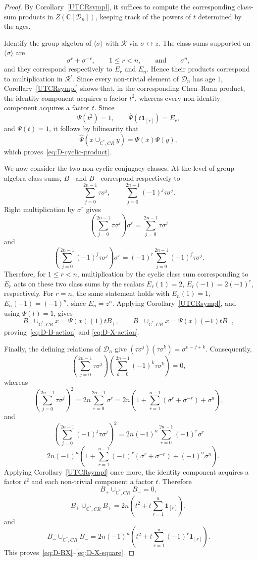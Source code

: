 \documentclass[a4paper,reqno]{amsart}
\theoremstyle{plain} %
\theoremstyle{definition} %
\theoremstyle{remark} %
\newcommand{\C}{\mathbb{C}}
\newcommand{\fo}{\mathbf{1}}
\newcommand{\cD}{{\mathcal D}}
\newcommand{\1}{\mathds{1}}   %
\begin{document}
\begin{proof}
By Corollary~\ref{UTCRsympl}, it suffices to compute the
corresponding class-sum products in $Z(\C[\cD_n])$, keeping track of
the powers of $t$ determined by the ages.

Identify the group algebra of $\langle\sigma\rangle$ with $\mathcal R$
via $\sigma\leftrightarrow z$. The class sums supported on
$\langle\sigma\rangle$ are
\[
 \sigma^r+\sigma^{-r},\qquad 1\leq r<n,
 \qquad\text{and}\qquad
 \sigma^n,
\]
and they correspond respectively to $E_r$ and $E_n$.
Hence their products correspond to multiplication in
$\mathcal R^\iota$. Since every non-trivial element of $\cD_n$ has
age $1$, Corollary~\ref{UTCRsympl} shows that, in the
corresponding Chen--Ruan product, the identity component acquires
a factor $t^2$, whereas every non-identity component acquires a
factor $t$. Since
\[
 \widehat\Psi(t^2)=1,\qquad
 \widehat\Psi(t\fo_{[r]})=E_r,
\]
and $\Psi(t)=1$, it follows by bilinearity that
\[
 \widehat\Psi(x\cup_{\C^*,CR}y)=\Psi(x)\Psi(y),
\]
which proves~\eqref{eq:D-cyclic-product}.

We now consider the two non-cyclic conjugacy classes.
At the level of group-algebra class sums, $B_+$ and $B_-$
correspond respectively to
\[
 \sum_{j=0}^{2n-1}\tau\sigma^j,
 \qquad
 \sum_{j=0}^{2n-1}(-1)^j\tau\sigma^j.
\]
Right multiplication by $\sigma^r$ gives
\[
 \left(\sum_{j=0}^{2n-1}\tau\sigma^j\right)\sigma^r
 =
 \sum_{j=0}^{2n-1}\tau\sigma^j
\]
and
\[
 \left(\sum_{j=0}^{2n-1}(-1)^j\tau\sigma^j\right)\sigma^r
 =
 (-1)^r\sum_{j=0}^{2n-1}(-1)^j\tau\sigma^j.
\]
Therefore, for $1\leq r<n$, multiplication by the cyclic class sum
corresponding to $E_r$ acts on these two class sums by the scalars
$E_r(1)=2$, $E_r(-1)=2(-1)^r$, respectively. For $r=n$, the same statement holds with
$E_n(1)=1$, $E_n(-1)=(-1)^n$, since $E_n=z^n$.  Applying Corollary~\ref{UTCRsympl}, and using
$\Psi(t)=1$, gives
\[
 B_+\cup_{\C^*,CR}x=\Psi(x)(1)tB_+,
 \qquad
 B_-\cup_{\C^*,CR}x=\Psi(x)(-1)tB_-,
\]
proving~\eqref{eq:D-B-action} and
\eqref{eq:D-X-action}.

Finally, the defining relations of $\cD_n$ give $(\tau\sigma^j)(\tau\sigma^k)=\sigma^{n-j+k}$.
Consequently,
\[
 \left(\sum_{j=0}^{2n-1}\tau\sigma^j\right)
 \left(\sum_{k=0}^{2n-1}(-1)^k\tau\sigma^k\right)=0,
\]
whereas
\[
 \left(\sum_{j=0}^{2n-1}\tau\sigma^j\right)^2
 =
 2n\sum_{r=0}^{2n-1}\sigma^r
 =
 2n\left(
  1+\sum_{r=1}^{n-1}(\sigma^r+\sigma^{-r})+\sigma^n
 \right),
\]
and
\[
 \left(\sum_{j=0}^{2n-1}(-1)^j\tau\sigma^j\right)^2
 =
 2n(-1)^n\sum_{r=0}^{2n-1}(-1)^r\sigma^r
\]
\[
 =
 2n(-1)^n\left(
  1+\sum_{r=1}^{n-1}(-1)^r(\sigma^r+\sigma^{-r})
  +(-1)^n\sigma^n
 \right).
\]
Applying Corollary~\ref{UTCRsympl} once more, the identity
component acquires a factor $t^2$ and each non-trivial component
a factor $t$. Therefore
\[
 B_+\cup_{\C^*,CR}B_-=0,
\]
\[
 B_+\cup_{\C^*,CR}B_+
 =
 2n\left(t^2+t\sum_{r=1}^n\fo_{[r]}\right),
\]
and
\[
 B_-\cup_{\C^*,CR}B_-
 =
 2n(-1)^n
 \left(t^2+t\sum_{r=1}^n(-1)^r\fo_{[r]}\right).
\]
This proves~\eqref{eq:D-BX}--\eqref{eq:D-X-square}.
\end{proof}
\end{document}
